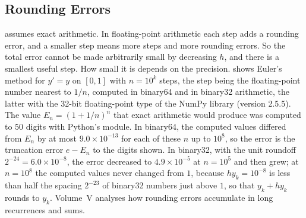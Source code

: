 \subsection{Rounding Errors}

 assumes exact arithmetic. In floating-point arithmetic each step adds a rounding error, and a smaller step means more steps and more rounding errors. So the total error cannot be made arbitrarily small by decreasing $h$, and there is a smallest useful step. How small it is depends on the precision.  shows Euler's method for $y'=y$ on $[0,1]$ with $n=10^k$ steps, the step being the floating-point number nearest to $1/n$, computed in binary64 and in binary32 arithmetic, the latter with the 32-bit floating-point type of the NumPy library (version 2.5.5). The value $E_n=(1+1/n)^n$ that exact arithmetic would produce was computed to $50$ digits with Python's  module. In binary64, the computed values differed from $E_n$ by at most $9.0\times10^{-13}$ for each of these $n$ up to $10^8$, so the error is the truncation error $e-E_n$ to the digits shown. In binary32, with the unit roundoff $2^{-24}=6.0\times10^{-8}$, the error decreased to $4.9\times10^{-5}$ at $n=10^5$ and then grew; at $n=10^8$ the computed values never changed from $1$, because $hy_k=10^{-8}$ is less than half the spacing $2^{-23}$ of binary32 numbers just above $1$, so that $y_k+hy_k$ rounds to $y_k$. Volume~V analyses how rounding errors accumulate in long recurrences and sums.

\begin{table}
\end{table}

